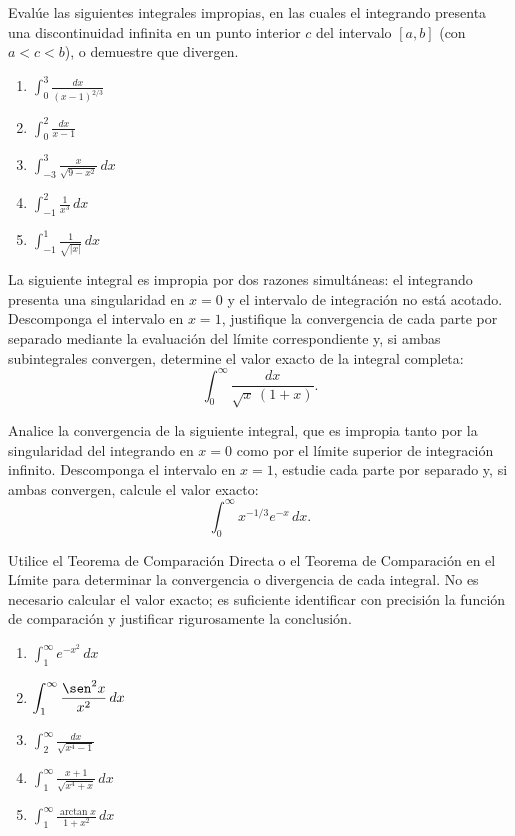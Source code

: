 \begin{prob}
Evalúe las siguientes integrales impropias, en las cuales el integrando
presenta una discontinuidad infinita en un punto interior $c$ del intervalo
$[a, b]$ (con $a < c < b$), o demuestre que divergen.
\begin{enumerate}
    \item $\displaystyle \int_{0}^{3} \frac{dx}{(x-1)^{2/3}}$
    \item $\displaystyle \int_{0}^{2} \frac{dx}{x - 1}$
    \item $\displaystyle \int_{-3}^{3} \frac{x}{\sqrt{9 - x^2}} \, dx$
    \item $\displaystyle \int_{-1}^{2} \frac{1}{x^3} \, dx$
    \item $\displaystyle \int_{-1}^{1} \frac{1}{\sqrt{|x|}} \, dx$
\end{enumerate}
\end{prob}

\begin{prob}
La siguiente integral es impropia por dos razones simultáneas: el
integrando presenta una singularidad en $x = 0$ y el intervalo de
integración no está acotado. Descomponga el intervalo en $x = 1$,
justifique la convergencia de cada parte por separado mediante la
evaluación del límite correspondiente y, si ambas subintegrales convergen,
determine el valor exacto de la integral completa:
\[
    \int_{0}^{\infty} \frac{dx}{\sqrt{x}\,(1 + x)}.
\]
\end{prob}

\begin{prob}
Analice la convergencia de la siguiente integral, que es impropia tanto
por la singularidad del integrando en $x = 0$ como por el límite superior
de integración infinito. Descomponga el intervalo en $x = 1$, estudie
cada parte por separado y, si ambas convergen, calcule el valor exacto:
\[
    \int_{0}^{\infty} x^{-1/3} e^{-x} \, dx.
\]
\end{prob}

\begin{prob}
Utilice el Teorema de Comparación Directa o el Teorema de Comparación en
el Límite para determinar la convergencia o divergencia de cada integral.
No es necesario calcular el valor exacto; es suficiente identificar con
precisión la función de comparación y justificar rigurosamente la
conclusión.
\begin{enumerate}
    \item $\displaystyle \int_{1}^{\infty} e^{-x^2} \, dx$
    \item $\displaystyle \int_{1}^{\infty} \frac{\sen^2 x}{x^2} \, dx$
    \item $\displaystyle \int_{2}^{\infty} \frac{dx}{\sqrt{x^4 - 1}}$
    \item $\displaystyle \int_{1}^{\infty} \frac{x + 1}{\sqrt{x^4 + x}} \, dx$
    \item $\displaystyle \int_{1}^{\infty} \frac{\arctan x}{1 + x^2} \, dx$
\end{enumerate}
\end{prob}

